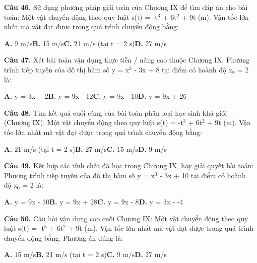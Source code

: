 \documentclass[11pt,a4paper]{article}
\begin{document}
\textbf{\color{primary} Câu 46.} Sử dụng phương pháp giải toán của Chương IX để tìm đáp án cho bài toán: Một vật chuyển động theo quy luật s(t) = -t$^3$ + 6t$^2$ + 9t (m). Vận tốc lớn nhất mà vật đạt được trong quá trình chuyển động bằng:\par
\hspace*{1.5em}\textbf{A.} 9 m/s\quad\quad \textbf{B.} 15 m/s\quad\quad \textbf{C.} 21 m/s (tại t = 2 s)\quad\quad \textbf{D.} 27 m/s\par\vspace{2pt}
\textbf{\color{primary} Câu 47.} Xét bài toán vận dụng thực tiễn / nâng cao thuộc Chương IX: Phương trình tiếp tuyến của đồ thị hàm số y = x$^3$ - 3x + 8 tại điểm có hoành độ x$_0$ = 2 là:\par
\hspace*{1.5em}\textbf{A.} y = 3x - -2\quad\quad \textbf{B.} y = 9x - 12\quad\quad \textbf{C.} y = 9x - 10\quad\quad \textbf{D.} y = 9x + 26\par\vspace{2pt}
\textbf{\color{primary} Câu 48.} Tìm kết quả cuối cùng của bài toán phân loại học sinh khá giỏi (Chương IX): Một vật chuyển động theo quy luật s(t) = -t$^3$ + 6t$^2$ + 9t (m). Vận tốc lớn nhất mà vật đạt được trong quá trình chuyển động bằng:\par
\hspace*{1.5em}\textbf{A.} 21 m/s (tại t = 2 s)\quad\quad \textbf{B.} 27 m/s\quad\quad \textbf{C.} 15 m/s\quad\quad \textbf{D.} 9 m/s\par\vspace{2pt}
\textbf{\color{primary} Câu 49.} Kết hợp các tính chất đã học trong Chương IX, hãy giải quyết bài toán: Phương trình tiếp tuyến của đồ thị hàm số y = x$^3$ - 3x + 10 tại điểm có hoành độ x$_0$ = 2 là:\par
\hspace*{1.5em}\textbf{A.} y = 9x - 10\quad\quad \textbf{B.} y = 9x + 28\quad\quad \textbf{C.} y = 9x - 8\quad\quad \textbf{D.} y = 3x - -4\par\vspace{2pt}
\textbf{\color{primary} Câu 50.} Câu hỏi vận dụng cao cuối Chương IX: Một vật chuyển động theo quy luật s(t) = -t$^3$ + 6t$^2$ + 9t (m). Vận tốc lớn nhất mà vật đạt được trong quá trình chuyển động bằng. Phương án đúng là:\par
\hspace*{1.5em}\textbf{A.} 15 m/s\quad\quad \textbf{B.} 21 m/s (tại t = 2 s)\quad\quad \textbf{C.} 9 m/s\quad\quad \textbf{D.} 27 m/s\par\vspace{2pt}
\end{document}
